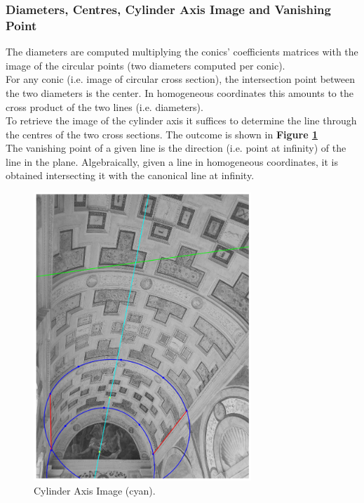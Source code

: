 \documentclass[12pt,a4paper]{article}
\begin{document}
\subsubsection{Diameters, Centres, Cylinder Axis Image and Vanishing Point}\label{sec:toAxisImageVanishingPoint}
The diameters are computed multiplying the conics' coefficients matrices with the image of the circular points (two diameters computed per conic).\\

For any conic (i.e. image of circular cross section), the intersection point between the two diameters is the center. In homogeneous coordinates this amounts to the cross product of the two lines (i.e. diameters).\\

To retrieve the image of the cylinder axis it suffices to determine the line through the centres of the two cross sections. The outcome is shown in \textbf{Figure \ref{fig:axisImage}}\\

The vanishing point of a given line is the direction (i.e. point at infinity) of the line in the plane. Algebraically, given a line in homogeneous coordinates, it is obtained intersecting it with the canonical line at infinity.

\begin{figure}[H]
    \centering
    \includegraphics[width=0.73\textwidth]{Images/PalazzoTe_axis.png}
    \caption[Cylinder Axis Image.]{Cylinder Axis Image (cyan).}
    \label{fig:axisImage}
\end{figure}
\end{document}
